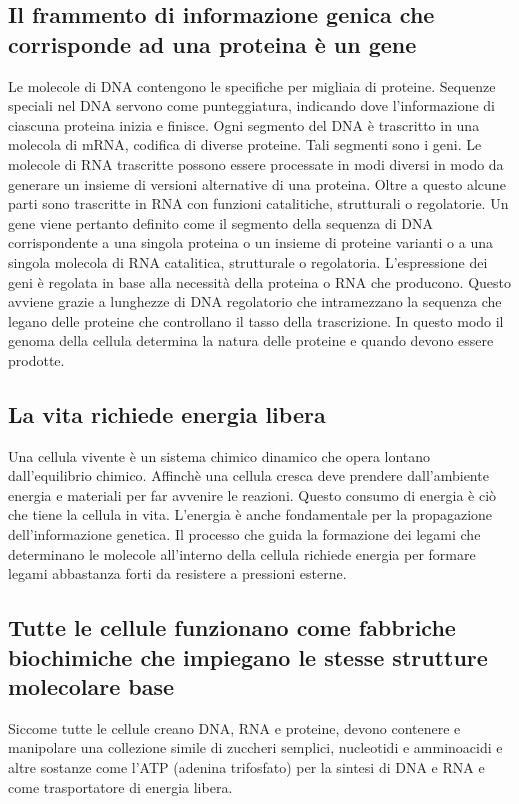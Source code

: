\subsection{Il frammento di informazione genica che corrisponde ad una proteina \`e un gene}
Le molecole di DNA contengono le specifiche per migliaia di proteine. Sequenze speciali nel DNA servono come punteggiatura, indicando dove l'informazione di ciascuna proteina inizia e
finisce. Ogni segmento del DNA \`e trascritto in una molecola di mRNA, codifica di diverse proteine. Tali segmenti sono i geni. Le molecole di RNA trascritte possono essere processate
in modi diversi in modo da generare un insieme di versioni alternative di una proteina. Oltre a questo alcune parti sono trascritte in RNA con funzioni catalitiche, strutturali o 
regolatorie. Un gene viene pertanto definito come il segmento della sequenza di DNA corrispondente a una singola proteina o un insieme di proteine varianti o a una singola molecola di 
RNA catalitica, strutturale o regolatoria. L'espressione dei geni \`e regolata in base alla necessit\`a della proteina o RNA che producono. Questo avviene grazie a lunghezze di DNA
regolatorio che intramezzano la sequenza che legano delle proteine che controllano il tasso della trascrizione. In questo modo il genoma della cellula determina la natura delle proteine e
quando devono essere prodotte.
\subsection{La vita richiede energia libera}
Una cellula vivente \`e un sistema chimico dinamico che opera lontano dall'equilibrio chimico. Affinch\`e una cellula cresca deve prendere dall'ambiente energia e materiali per far
avvenire le reazioni. Questo consumo di energia \`e ci\`o che tiene la cellula in vita. L'energia \`e anche fondamentale per la propagazione dell'informazione genetica. Il processo che
guida la formazione dei legami che determinano le molecole all'interno della cellula richiede energia per formare legami abbastanza forti da resistere a pressioni esterne. 
\subsection{Tutte le cellule funzionano come fabbriche biochimiche che impiegano le stesse strutture molecolare base}
Siccome tutte le cellule creano DNA, RNA e proteine, devono contenere e manipolare una collezione simile di zuccheri semplici, nucleotidi e amminoacidi e altre sostanze come l'ATP 
(adenina trifosfato) per la sintesi di DNA e RNA e come trasportatore di energia libera. 
